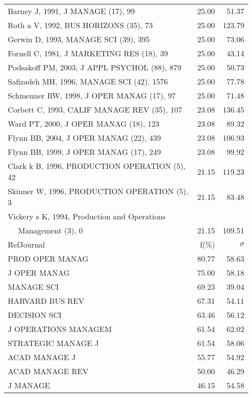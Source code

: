\documentclass[a4paper,11pt]{report}
\begin{document}
\begin{landscape}
\begin{table}[!ht]
{\begin{tabular}{|l r r|}
Barney J, 1991, J MANAGE (17), 99 & 25.00 & 51.37\\
Roth a V, 1992, BUS HORIZONS (35), 73 & 25.00 & 123.79\\
Gerwin D, 1993, MANAGE SCI (39), 395 & 25.00 & 73.06\\
Fornell C, 1981, J MARKETING RES (18), 39 & 25.00 & 43.14\\
Podsakoff PM, 2003, J APPL PSYCHOL (88), 879 & 25.00 & 50.73\\
Safizadeh MH, 1996, MANAGE SCI (42), 1576 & 25.00 & 77.78\\
Schmenner RW, 1998, J OPER MANAG (17), 97 & 25.00 & 71.48\\
Corbett C, 1993, CALIF MANAGE REV (35), 107 & 23.08 & 136.45\\
Ward PT, 2000, J OPER MANAG (18), 123 & 23.08 & 89.32\\
Flynn BB, 2004, J OPER MANAG (22), 439 & 23.08 & 106.93\\
Flynn BB, 1999, J OPER MANAG (17), 249 & 23.08 & 99.92\\
Clark k B, 1996, PRODUCTION OPERATION (5), 42 & 21.15 & 119.23\\
Skinner W, 1996, PRODUCTION OPERATION (5), 3 & 21.15 & 83.48\\
Vickery s K, 1994, Production and Operations &  & \\
$\quad$ Management (3), 0 & 21.15 & 109.51\\
\hline
\hline
RefJournal & f(\%) & $\sigma$\\
\hline
PROD OPER MANAG & 80.77 & 58.63\\
J OPER MANAG & 75.00 & 58.18\\
MANAGE SCI & 69.23 & 39.04\\
HARVARD BUS REV & 67.31 & 54.11\\
DECISION SCI & 63.46 & 56.12\\
J OPERATIONS MANAGEM & 61.54 & 62.02\\
STRATEGIC MANAGE J & 61.54 & 58.06\\
ACAD MANAGE J & 55.77 & 54.92\\
ACAD MANAGE REV & 50.00 & 46.29\\
J MANAGE & 46.15 & 54.58\\
\hline
\end{tabular}
}
\end{table}

\end{landscape}
\end{document}
